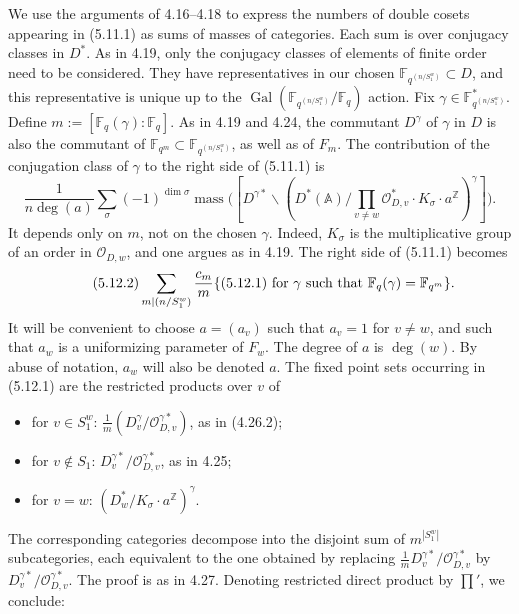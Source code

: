 \documentclass[10pt]{article}
\newcommand{\Fq}{\mathbb F_q}
\newcommand{\Fqm}{\mathbb F_{q^m}}
\newcommand{\Z}{\mathbb Z}
\newcommand{\Adele}{\mathbb A}
\newcommand{\Gal}{\operatorname{Gal}}
\newcommand{\degm}{\operatorname{deg}}
\newcommand{\mass}{\operatorname{mass}}
\theoremstyle{deligne}
\newcommand{\heading}[1]{\vspace{0.7em}\noindent{\bfseries #1}\quad}
\begin{document}
\heading{5.12.} We use the arguments of 4.16--4.18 to express the numbers of double cosets appearing in (5.11.1) as sums of masses of categories. Each sum is over conjugacy classes in $D^*$. As in 4.19, only the conjugacy classes of elements of finite order need to be considered. They have representatives in our chosen $\mathbb F_{q^{(n/S_1^w)}}\subset D$, and this representative is unique up to the $\Gal(\mathbb F_{q^{(n/S_1^w)}}/\Fq)$ action. Fix $\gamma\in\mathbb F_{q^{(n/S_1^w)}}^*$. Define $m:=[\Fq(\gamma):\Fq]$. As in 4.19 and 4.24, the commutant $D^\gamma$ of $\gamma$ in $D$ is also the commutant of $\Fqm\subset\mathbb F_{q^{(n/S_1^w)}}$, as well as of $F_m$. The contribution of the conjugation class of $\gamma$ to the right side of (5.11.1) is
\begin{equation}\tag{5.12.1}
\frac{1}{n\degm(a)}\sum_\sigma(-1)^{\dim\sigma}
\mass\bigl([D^{\gamma *}\backslash(D^*(\Adele)/\prod_{v\ne w}\mathcal O_{D,v}^*\cdot K_\sigma\cdot a^\Z)^\gamma]\bigr).
\end{equation}
It depends only on $m$, not on the chosen $\gamma$. Indeed, $K_\sigma$ is the multiplicative group of an order in $\mathcal O_{D,w}$, and one argues as in 4.19. The right side of (5.11.1) becomes
\begin{equation}\tag{5.12.2}
\sum_{m\mid(n/S_1^w)}\frac{c_m}{m}\{\hbox{(5.12.1) for }\gamma\hbox{ such that }\Fq(\gamma)=\Fqm\}.
\end{equation}
It will be convenient to choose $a=(a_v)$ such that $a_v=1$ for $v\ne w$, and such that $a_w$ is a uniformizing parameter of $F_w$. The degree of $a$ is $\degm(w)$. By abuse of notation, $a_w$ will also be denoted $a$. The fixed point sets occurring in (5.12.1) are the restricted products over $v$ of
\begin{itemize}
\item for $v\in S_1^w$: $\frac1m(D_v^\gamma/\mathcal O_{D,v}^{\gamma *})$, as in (4.26.2);
\item for $v\notin S_1$: $D_v^{\gamma *}/\mathcal O_{D,v}^{\gamma *}$, as in 4.25;
\item for $v=w$: $(D_w^*/K_\sigma\cdot a^\Z)^\gamma$.
\end{itemize}
The corresponding categories decompose into the disjoint sum of $m^{|S_1^w|}$ subcategories, each equivalent to the one obtained by replacing $\frac1mD_v^{\gamma *}/\mathcal O_{D,v}^{\gamma *}$ by $D_v^{\gamma *}/\mathcal O_{D,v}^{\gamma *}$. The proof is as in 4.27. Denoting restricted direct product by $\prod'$, we conclude:
\end{document}
